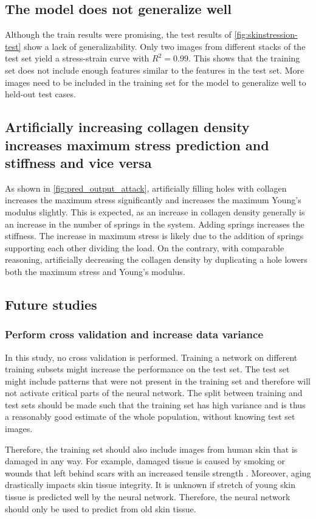 \subsection{The model does not generalize well}
Although the train results were promising, the test results of \cref{fig:skinstression-test} show a lack of generalizability.
Only two images from different stacks of the test set yield a stress-strain curve with $R^2=0.99$.
This shows that the training set does not include enough features similar to the features in the test set.
More images need to be included in the training set for the model to generalize well to held-out test cases.

\subsection{Artificially increasing collagen density increases maximum stress prediction and stiffness and vice versa}
As shown in \cref{fig:pred_output_attack}, artificially filling holes with collagen increases the maximum stress significantly and increases the maximum Young's modulus slightly.
This is expected, as an increase in collagen density generally is an increase in the number of springs in the system.
Adding springs increases the stiffness.
The increase in maximum stress is likely due to the addition of springs supporting each other dividing the load.
On the contrary, with comparable reasoning, artificially decreasing the collagen density by duplicating a hole lowers both the maximum stress and Young's modulus.

\subsection{Future studies}
\subsubsection{Perform cross validation and increase data variance}
In this study, no cross validation is performed.
Training a network on different training subsets might increase the performance on the test set.
The test set might include patterns that were not present in the training set and therefore will not activate critical parts of the neural network.
The split between training and test sets should be made such that the training set has high variance and is thus a reasonably good estimate of the whole population, without knowing test set images.

Therefore, the training set should also include images from human skin that is damaged in any way.
For example, damaged tissue is caused by smoking \cite{Lipa2021} or wounds that left behind scars with an increased tensile strength \cite{Wilkinson2020}.
Moreover, aging drastically impacts skin tissue integrity.
It is unknown if stretch of young skin tissue is predicted well by the neural network.
Therefore, the neural network should only be used to predict from old skin tissue.


